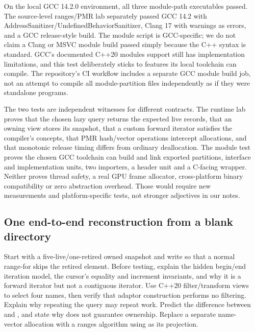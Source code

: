 On the local GCC 14.2.0 environment, all three module-path executables passed. The source-level ranges/PMR lab separately passed GCC 14.2 with AddressSanitizer/UndefinedBehaviorSanitizer, Clang 17 with warnings as errors, and a GCC release-style  build. The module script is GCC-specific; we do not claim a Clang or MSVC module build passed simply because the C++ syntax is standard. GCC's documented C++20 modules support still has implementation limitations, and this test deliberately sticks to features its local toolchain can compile. The repository's CI workflow includes a separate GCC module build job, not an attempt to compile all module-partition files independently as if they were standalone  programs.

The two tests are independent witnesses for different contracts. The runtime lab proves that the chosen lazy query returns the expected live records, that an owning view stores its snapshot, that a custom forward iterator satisfies the compiler's concepts, that PMR hash/vector operations intercept allocations, and that monotonic release timing differs from ordinary deallocation. The module test proves the chosen GCC toolchain can build and link exported partitions, interface and implementation units, two importers, a header unit and a C-facing wrapper. Neither proves thread safety, a real GPU frame allocator, cross-platform binary compatibility or zero abstraction overhead. Those would require new measurements and platform-specific tests, not stronger adjectives in our notes.

\subsection{One end-to-end reconstruction from a blank directory}\label{05-engine-i-ch006-one-end-to-end-reconstruction-from-a-blank-directory}

\hypertarget{05-engine-i-ch006-one-end-to-end-reconstruction-from-a-blank-directory}{}

Start with a five-live/one-retired owned snapshot and write  so that a normal range-for skips the retired element. Before testing, explain the hidden begin/end iteration model, the cursor's equality and increment invariants, and why it is a forward iterator but not a contiguous iterator. Use C++20 filter/transform views to select four names, then verify that adaptor construction performs no filtering. Explain why repeating the query may repeat work. Predict the difference between  and , and state why  does not guarantee ownership. Replace a separate name-vector allocation with a ranges algorithm using  as its projection.

